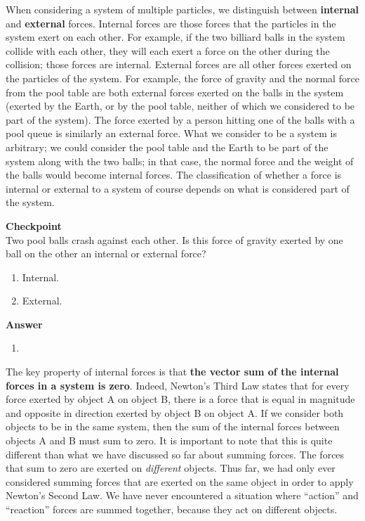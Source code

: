 When considering a system of multiple particles, we distinguish between \textbf{internal} and \textbf{external} forces. Internal forces are those forces that the particles in the system exert on each other. For example, if the two billiard balls in the system collide with each other, they will each exert a force on the other during the collision; those forces are internal. External forces are all other forces exerted on the particles of the system. For example, the force of gravity and the normal force from the pool table are both external forces exerted on the balls in the system (exerted by the Earth, or by the pool table, neither of which we considered to be part of the system). The force exerted by a person hitting one of the balls with a pool queue is similarly an external force. What we consider to be a system is arbitrary; we could consider the pool table and the Earth to be part of the system along with the two balls; in that case, the normal force and the weight of the balls would become internal forces. The classification of whether a force is internal or external to a system of course depends on what is considered part of the system.

\begin{framed}
\textbf{Checkpoint}\\
Two pool balls crash against each other. Is this force of gravity exerted by one ball on the other an internal or external force?

\begin{enumerate}
\item Internal.
\item External.
\end{enumerate}

\begin{framed}
\textbf{Answer}\\
\begin{enumerate}
\item
\end{enumerate}
\end{framed}
\end{framed}

The key property of internal forces is that \textbf{the vector sum of the internal forces in a system is zero}. Indeed, Newton's Third Law states that for every force exerted by object A on object B, there is a force that is equal in magnitude and opposite in direction exerted by object B on object A. If we consider both objects to be in the same system, then the sum of the internal forces between objects A and B must sum to zero. It is important to note that this is quite different than what we have discussed so far about summing forces. The forces that sum to zero are exerted on \textit{different} objects. Thus far, we had only ever considered summing forces that are exerted on the same object in order to apply Newton's Second Law. We have never encountered a situation where ``action'' and ``reaction'' forces are summed together, because they act on different objects.

